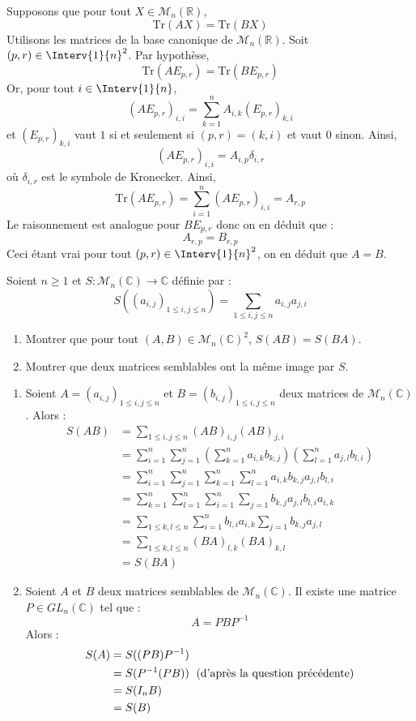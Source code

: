 \documentclass[a4paper,10pt]{report}
\begin{document}
\corr Supposons que pour tout $X \in \mathcal{M}_n(\mathbb{R})$, 
$$\textrm{Tr}(AX)= \textrm{Tr}(BX)$$
Utilisons les matrices de la base canonique de $\mathcal{M}_n(\mathbb{R})$. Soit $(p,r) \in \Interv{1}{n}^2$. Par hypothèse,
$$ \textrm{Tr}(AE_{p,r})= \textrm{Tr}(BE_{p,r})$$
Or, pour tout $i \in \Interv{1}{n}$,
$$ (A E_{p,r})_{i,i} = \sum_{k=1}^n A_{i,k} (E_{p,r})_{k,i} $$
et $(E_{p,r})_{k,i}$ vaut $1$ si et seulement si $(p,r)=(k,i)$ et vaut $0$ sinon. Ainsi,
$$ (A E_{p,r})_{i,i} = A_{i,p} \delta_{i,r}$$
où $\delta_{i,r}$ est le symbole de Kronecker. Ainsi,
 $$ \textrm{Tr}(AE_{p,r}) = \sum_{i=1}^n (A E_{p,r})_{i,i} = A_{r,p}$$
 Le raisonnement est analogue pour $B E_{p,r}$ donc on en déduit que :
 $$ A_{r,p}= B_{r,p}$$
 Ceci étant vrai pour tout $(p,r) \in \Interv{1}{n}^2$, on en déduit que $A=B$.

\begin{Exa} Soient $n \geq 1$ et $S : \mathcal{M}_n(\mathbb{C}) \rightarrow \mathbb{C}$ définie par :
$$ S((a_{i,j})_{1 \leq i,j \leq n}) = \sum_{1 \leq i,j \leq n} a_{i,j} a_{j,i}$$

\begin{enumerate}
\item Montrer que pour tout $(A,B) \in \mathcal{M}_n(\mathbb{C})^2$, $S(AB)=S(BA)$.
\item Montrer que deux matrices semblables ont la même image par $S$.
\end{enumerate}
\end{Exa}

\corr 

\begin{enumerate}
\item Soient $A=(a_{i,j})_{1 \leq i,j \leq n}$ et $B= (b_{i,j})_{1 \leq i,j \leq n}$  deux matrices de $\mathcal{M}_n(\mathbb{C})$. Alors :
\begin{align*}
S(AB) & =  \sum_{1 \leq i,j \leq n} (AB)_{i,j} (AB)_{j,i} \\
& = \sum_{i=1}^n \sum_{j=1}^n \left( \sum_{k=1}^n a_{i,k} b_{k,j} \right) \left( \sum_{l=1}^n a_{j,l} b_{l,i} \right) \\
& =  \sum_{i=1}^n \sum_{j=1}^n \sum_{k=1}^n \sum_{l=1}^n a_{i,k} b_{k,j} a_{j,l} b_{l,i} \\
& = \sum_{k=1}^n \sum_{l=1}^n \sum_{i=1}^n \sum_{j=1} b_{k,j} a_{j,l} b_{l,i} a_{i,k} \\
& = \sum_{1 \leq k,l \leq n} \sum_{i=1}^n  b_{l,i} a_{i,k}  \sum_{j=1} b_{k,j} a_{j,l} \\
& = \sum_{1 \leq k,l \leq n} (BA)_{l,k} (BA)_{k,l} \\
& = S(BA) 
\end{align*}
\item Soient $A$ et $B$ deux matrices semblables de $\mathcal{M}_n(\mathbb{C})$. Il existe une matrice $P \in GL_n(\mathbb{C})$ tel que :
$$ A=PBP^{-1}$$
Alors :
\begin{align*}
S(A) & = S((PB)P^{-1}) \\
& = S(P^{-1} (PB)) \; \hbox{ (d'après la question précédente)} \\
& = S(I_n B) \\
& = S(B)
\end{align*}
\end{enumerate}
\end{document}

